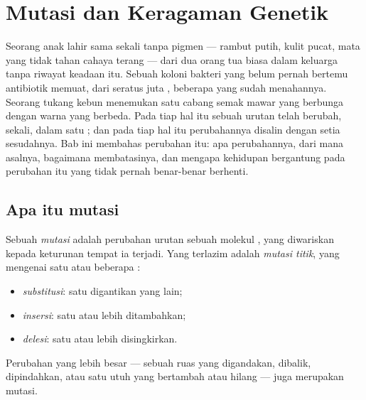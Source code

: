 \chapter{Mutasi dan Keragaman Genetik}\label{ch:g11:mutations}

Seorang anak lahir sama sekali tanpa pigmen --- rambut putih, kulit
pucat, mata yang tidak tahan cahaya terang --- dari dua orang tua biasa
dalam keluarga tanpa riwayat keadaan itu. Sebuah koloni bakteri yang
belum pernah bertemu antibiotik memuat, dari seratus juta ,
beberapa yang sudah menahannya. Seorang tukang kebun menemukan satu
cabang semak mawar yang berbunga dengan warna yang berbeda. Pada tiap
hal itu sebuah urutan  telah berubah, sekali, dalam satu ; dan
pada tiap hal itu perubahannya disalin dengan setia sesudahnya. Bab ini
membahas perubahan itu: apa perubahannya, dari mana asalnya, bagaimana
 membatasinya, dan mengapa kehidupan bergantung pada perubahan
itu yang tidak pernah benar-benar berhenti.

\section{Apa itu mutasi}

\begin{definition}[Mutasi]\label{def:g11:mutations:mutation}
Sebuah \emph{mutasi} adalah perubahan urutan 
sebuah molekul , yang diwariskan kepada keturunan  tempat ia
terjadi. Yang terlazim adalah \emph{mutasi titik}, yang mengenai satu
atau beberapa :
\begin{itemize}
  \item \emph{substitusi}: satu  digantikan yang lain;
  \item \emph{insersi}: satu  atau lebih ditambahkan;
  \item \emph{delesi}: satu  atau lebih disingkirkan.
\end{itemize}
Perubahan yang lebih besar --- sebuah ruas yang digandakan, dibalik,
dipindahkan, atau satu  utuh yang bertambah atau hilang ---
juga merupakan mutasi.
\end{definition}

